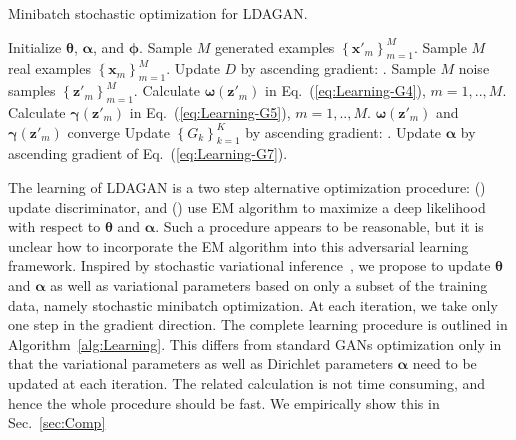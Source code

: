 \documentclass{article}
\begin{document}
\begin{algorithm}[t]
   \caption{Minibatch stochastic optimization for LDAGAN.}
   \label{alg:Learning}
\begin{algorithmic}[1]

   \REQUIRE Initialize $\bm{\theta}$, $\bm{\alpha}$, and $\bm{\phi}$.
   \STATE Sample $M$ generated examples $\left\{\mathbf{x}'_m\right\}_{m=1}^M$.
   \STATE Sample $M$ real examples $\left\{\mathbf{x}_m\right\}_{m=1}^M$.
   \STATE Update $D$ by ascending gradient:
   .
   \STATE Sample $M$ noise samples $\left\{\mathbf{z}'_m\right\}_{m=1}^M$.
   \REPEAT
      \STATE Calculate $\bm{\omega}\left(\mathbf{z}'_m\right)$ in Eq.~(\ref{eq:Learning-G4}), $m=1,..,M$.
      \STATE Calculate $\bm{\gamma}\left(\mathbf{z}'_m\right)$ in Eq.~(\ref{eq:Learning-G5}), $m=1,..,M$.
   \UNTIL $\bm{\omega}\left(\mathbf{z}'_m\right)$ and $\bm{\gamma}\left(\mathbf{z}'_m\right)$ converge
   \STATE Update $\left\{G_k\right\}_{k=1}^K$ by ascending gradient:
   .
   \STATE Update $\bm{\alpha}$ by ascending gradient of Eq.~(\ref{eq:Learning-G7}).
   \ENDFOR
\end{algorithmic}
\end{algorithm}


The learning of LDAGAN is a two step alternative optimization procedure: () update discriminator, and () use EM algorithm to maximize a deep likelihood with respect to $\bm{\theta}$ and $\bm{\alpha}$.
Such a procedure appears to be reasonable, but it is unclear how to incorporate the EM algorithm into this adversarial learning framework.
Inspired by stochastic variational inference~\cite{hoffman2013stochastic}, we propose to update $\bm{\theta}$ and $\bm{\alpha}$ as well as variational parameters based on only a subset of the training data, namely stochastic minibatch optimization.
At each iteration, we take only one step in the gradient direction.
The complete learning procedure is outlined in Algorithm~\ref{alg:Learning}.
This differs from standard GANs optimization only in that the variational parameters as well as Dirichlet parameters $\bm{\alpha}$ need to be updated at each iteration.
The related calculation is not time consuming, and hence the whole procedure should be fast.
We empirically show this in Sec.~\ref{sec:Comp}
\end{document}
